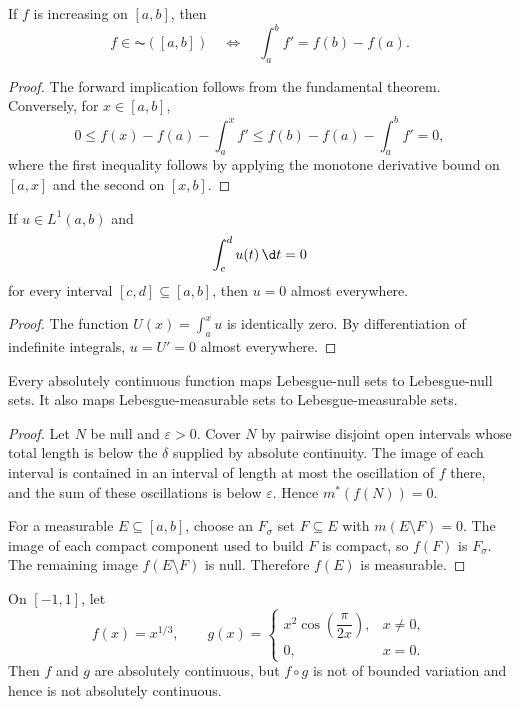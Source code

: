 \begin{cor}
If $f$ is increasing on $[a,b]$, then
\[
f\in\AC([a,b])
\quad\Longleftrightarrow\quad
\int_a^b f'=f(b)-f(a).
\]
\end{cor}

\begin{proof}
The forward implication follows from the fundamental theorem. Conversely, for $x\in[a,b]$,
\[
0\leq f(x)-f(a)-\int_a^x f'
\leq f(b)-f(a)-\int_a^b f'=0,
\]
where the first inequality follows by applying the monotone derivative bound on $[a,x]$ and the second on $[x,b]$.
\end{proof}

\begin{lem}
If $u\in L^1(a,b)$ and
\[
\int_c^d u(t)\,\d t=0
\]
for every interval $[c,d]\subseteq[a,b]$, then $u=0$ almost everywhere.
\end{lem}

\begin{proof}
The function $U(x)=\int_a^x u$ is identically zero. By differentiation of indefinite integrals, $u=U'=0$ almost everywhere.
\end{proof}

\begin{thm}
Every absolutely continuous function maps Lebesgue-null sets to Lebesgue-null sets. It also maps Lebesgue-measurable sets to Lebesgue-measurable sets.
\end{thm}

\begin{proof}
Let $N$ be null and $\varepsilon>0$. Cover $N$ by pairwise disjoint open intervals whose total length is below the $\delta$ supplied by absolute continuity. The image of each interval is contained in an interval of length at most the oscillation of $f$ there, and the sum of these oscillations is below $\varepsilon$. Hence $m^*(f(N))=0$.

For a measurable $E\subseteq[a,b]$, choose an $F_\sigma$ set $F\subseteq E$ with $m(E\setminus F)=0$. The image of each compact component used to build $F$ is compact, so $f(F)$ is $F_\sigma$. The remaining image $f(E\setminus F)$ is null. Therefore $f(E)$ is measurable.
\end{proof}

\begin{exercise}
On $[-1,1]$, let
\[
f(x)=x^{1/3},
\qquad
g(x)=\begin{cases}x^2\cos\!\left(\dfrac{\pi}{2x}\right),&x\neq0,\\0,&x=0.
\end{cases}
\]
Then $f$ and $g$ are absolutely continuous, but $f\circ g$ is not of bounded variation and hence is not absolutely continuous.
\end{exercise}

